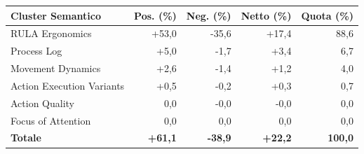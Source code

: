 \begin{tabular*}{\linewidth}{@{}l@{\extracolsep{\fill}}rrrr@{}}
\toprule
\textbf{Cluster Semantico} & \textbf{Pos. (\%)} & \textbf{Neg. (\%)} & \textbf{Netto (\%)} & \textbf{Quota (\%)} \\
\midrule
RULA Ergonomics & +53{,}0 & -35{,}6 & +17{,}4 & 88{,}6 \\
Process Log & +5{,}0 & -1{,}7 & +3{,}4 & 6{,}7 \\
Movement Dynamics & +2{,}6 & -1{,}4 & +1{,}2 & 4{,}0 \\
Action Execution Variants & +0{,}5 & -0{,}2 & +0{,}3 & 0{,}7 \\
Action Quality & 0{,}0 & -0{,}0 & -0{,}0 & 0{,}0 \\
Focus of Attention & 0{,}0 & 0{,}0 & 0{,}0 & 0{,}0 \\
\midrule
\textbf{Totale} & \textbf{+61{,}1} & \textbf{-38{,}9} & \textbf{+22{,}2} & \textbf{100{,}0} \\
\bottomrule
\end{tabular*}
